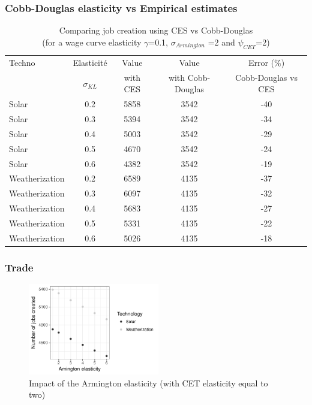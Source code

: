 \subsubsection{Cobb-Douglas elasticity vs Empirical estimates}

\begin{table}[!h]
	\centering
	\caption{Comparing job creation using CES vs Cobb-Douglas \\\hspace{\textwidth} (for a wage curve elasticity $\gamma$=0.1, $\sigma_{Armington}$ =2  and $\psi_{CET}$=2)}
	\label{tab:CobbDouglasError}
	\begin{tabular}{lcccc}
		\toprule
		Techno & Elasticité  &  Value & Value & Error (\%) \\
	    & $\sigma_{KL}$ &  with CES & with Cobb-Douglas& Cobb-Douglas vs CES \\
		\midrule 
		Solar & 0.2 &  5858 & 3542 & -40 \\
Solar & 0.3 &5394 & 3542 & -34 \\
Solar & 0.4 & 5003 & 3542 & -29 \\
Solar & 0.5 & 4670 & 3542 & -24 \\
Solar & 0.6 & 4382 & 3542 & -19 \\
Weatherization & 0.2 & 6589 & 4135 & -37 \\
Weatherization & 0.3 & 6097 & 4135 & -32 \\
Weatherization & 0.4 & 5683 & 4135 & -27 \\
Weatherization & 0.5 & 5331 & 4135 & -22 \\
Weatherization & 0.6 & 5026 & 4135 & -18 \\
		\bottomrule
	\end{tabular}
\end{table}

\clearpage

\subsubsection{Trade}

\begin{figure}[!h]
	\centering
	\includegraphics[height=4cm]{figures/Armington.pdf}
	\caption{Impact of the Armington elasticity (with CET elasticity equal to two)}
	\label{fig:armington}
\end{figure}

